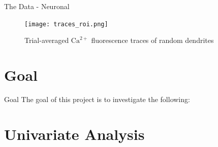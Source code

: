 \documentclass[10pt]{beamer}
\begin{document}
\begin{frame}[fragile]{The Data - Neuronal}
	\begin{center}
	\begin{figure}
	\caption*{Trial-averaged $\text{Ca}^{2+}$ fluorescence traces of random dendrites}
      \texttt{[image: traces\_roi.png]}
	\end{figure}
	\end{center}
\end{frame}

\section{Goal}
\begin{frame}[fragile]{Goal}
The goal of this project is to investigate the following:
\begin{itemize}
\end{itemize}
\end{frame}

\section{Univariate Analysis}
\end{document}
